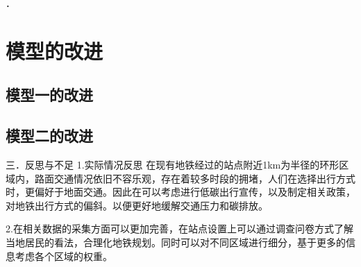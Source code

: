 \documentclass[12pt,a4paper]{mcmthesis}
\begin{document}
．

\section{模型的改进}

\subsection{模型一的改进}


\subsection{模型二的改进}
三．反思与不足
1.实际情况反思
在现有地铁经过的站点附近1km为半径的环形区域内，路面交通情况依旧不容乐观，存在着较多时段的拥堵，人们在选择出行方式时，更偏好于地面交通。因此在可以考虑进行低碳出行宣传，以及制定相关政策，对地铁出行方式的偏斜。以便更好地缓解交通压力和碳排放。

2.在相关数据的采集方面可以更加完善，在站点设置上可以通过调查问卷方式了解当地居民的看法，合理化地铁规划。同时可以对不同区域进行细分，基于更多的信息考虑各个区域的权重。
\end{document}
